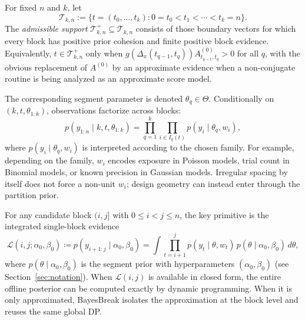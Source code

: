 \begin{definition}
\label{def:segmentation-space}
For fixed $n$ and $k$, let
\[
\mathcal{T}_{k,n}:=\{t=(t_0,\dots,t_k):0=t_0<t_1<\cdots<t_k=n\}.
\]
The \emph{admissible support} $\mathcal{T}^{+}_{k,n}\subseteq\mathcal{T}_{k,n}$ consists of
those boundary vectors for which every block has positive prior cohesion and finite positive
block evidence. Equivalently, $t\in\mathcal{T}^{+}_{k,n}$ only when
$g(\Delta_x(t_{q-1},t_q))A^{(0)}_{t_{q-1},t_q}>0$ for all $q$, with the obvious replacement of
$A^{(0)}$ by an approximate evidence when a non-conjugate routine is being analyzed as an
approximate score model.
\end{definition}

The corresponding segment parameter is denoted $\theta_q\in\Theta$. Conditionally on
$(k,t,\theta_{1:k})$, observations factorize across blocks:
\begin{equation}
p(y_{1:n}\mid k,t,\theta_{1:k})
= \prod_{q=1}^k \prod_{i\in I_q(t)} p(y_i\mid \theta_q, w_i),
\label{eq:problem-lik}
\end{equation}
where $p(y_i\mid\theta_q,w_i)$ is interpreted according to the chosen family. For example,
depending on the family, $w_i$ encodes exposure in Poisson models, trial count in Binomial models, or known precision
in Gaussian models. Irregular spacing by itself does not force a non-unit $w_i$; design geometry
can instead enter through the partition prior.

For any candidate block $(i,j]$ with $0\le i<j\le n$, the key primitive is the integrated
single-block evidence
\begin{equation}
\mathcal{L}(i,j;\alpha_0,\beta_0)
\coloneqq p(y_{i+1:j}\mid \alpha_0,\beta_0)
= \int \prod_{t=i+1}^j p(y_t\mid\theta,w_t)\,p(\theta\mid\alpha_0,\beta_0)\,d\theta,
\label{eq:problem-block-evidence}
\end{equation}
where $p(\theta\mid\alpha_0,\beta_0)$ is the segment prior with hyperparameters $(\alpha_0,\beta_0)$
(see Section~\ref{sec:notation}). When $\mathcal{L}(i,j)$ is available in closed form, the
entire offline posterior can be computed exactly by dynamic programming. When it is only
approximated, BayesBreak isolates the approximation at the block level and reuses the same global
DP.

